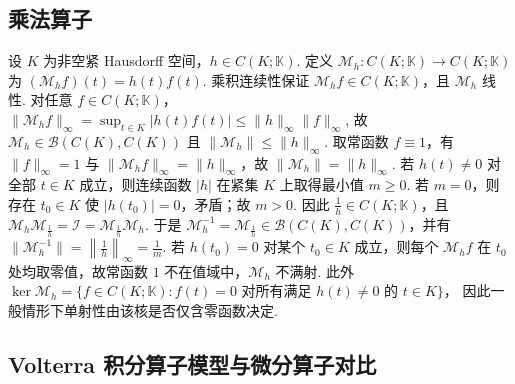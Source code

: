 \subsection{乘法算子}

\begin{FAExample}\label{i05:ex-mult}
设 \(\displaystyle K\) 为非空紧 Hausdorff 空间，\(\displaystyle h\in C(K;\mathbb K)\). 定义 \(\displaystyle \mathcal M_h:C(K;\mathbb K)\to C(K;\mathbb K)\) 为 \(\displaystyle (\mathcal M_hf)(t)=h(t)f(t)\).
乘积连续性保证 \(\displaystyle \mathcal M_hf\in C(K;\mathbb K)\)，且 \(\displaystyle \mathcal M_h\) 线性. 对任意 \(\displaystyle f\in C(K;\mathbb K)\)， \(\displaystyle \|\mathcal M_hf\|_\infty =\sup_{t\in K}|h(t)f(t)| \leqslant\|h\|_\infty\|f\|_\infty\),
故 \(\displaystyle \mathcal M_h\in\mathcal B(C(K),C(K))\) 且 \(\displaystyle \|\mathcal M_h\|\leqslant\|h\|_\infty\). 取常函数 \(\displaystyle f\equiv1\)，有 \(\displaystyle \|f\|_\infty=1\) 与 \(\displaystyle \|\mathcal M_hf\|_\infty=\|h\|_\infty\)，故 \(\displaystyle \|\mathcal M_h\|=\|h\|_\infty\).
若 \(\displaystyle h(t)\neq0\) 对全部 \(\displaystyle t\in K\) 成立，则连续函数 \(\displaystyle |h|\) 在紧集 \(\displaystyle K\) 上取得最小值 \(\displaystyle m\geqslant0\). 若 \(\displaystyle m=0\)，则存在 \(\displaystyle t_0\in K\) 使 \(\displaystyle |h(t_0)|=0\)，矛盾；故 \(\displaystyle m>0\). 因此 \(\displaystyle \frac{1}{h}\in C(K;\mathbb K)\)，且 \(\displaystyle \mathcal M_h\mathcal M_{\frac{1}{h}}=\mathcal I =\mathcal M_{\frac{1}{h}}\mathcal M_h\).
于是 \(\displaystyle \mathcal M_h^{-1}=\mathcal M_{\frac{1}{h}}\in\mathcal B(C(K),C(K))\)，并有 \(\displaystyle \|\mathcal M_h^{-1}\|=\left\|\frac{1}{h}\right\|_\infty=\frac{1}{m}\). 若 \(\displaystyle h(t_0)=0\) 对某个 \(\displaystyle t_0\in K\) 成立，则每个 \(\displaystyle \mathcal M_hf\) 在 \(\displaystyle t_0\) 处均取零值，故常函数 \(\displaystyle1\) 不在值域中，\(\displaystyle \mathcal M_h\) 不满射. 此外 \(\displaystyle \ker\mathcal M_h =\{f\in C(K;\mathbb K):f(t)=0\text{ 对所有满足 }h(t)\neq0\text{ 的 }t\in K\}\)，
因此一般情形下单射性由该核是否仅含零函数决定.
\end{FAExample}

\newpage
\subsection{Volterra 积分算子模型与微分算子对比}


